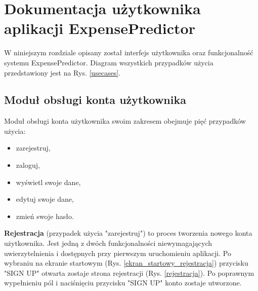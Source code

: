 \chapter{Dokumentacja użytkownika aplikacji ExpensePredictor}
W niniejszym rozdziale opisany został interfejs użytkownika oraz funkcjonalność systemu ExpensePredictor. Diagram wszystkich przypadków użycia przedstawiony jest na Rys. \ref{usecases}.
\section{Moduł obsługi konta użytkownika}
Moduł obsługi konta użytkownika swoim zakresem obejmuje pięć przypadków użycia:
\begin{itemize}
	\item zarejestruj,
	\item zaloguj,
	\item wyświetl swoje dane,
	\item edytuj swoje dane,
	\item zmień swoje hasło.
\end{itemize}
\textbf{Rejestracja} (przypadek użycia "zarejestruj") to proces tworzenia nowego konta użytkownika. Jest jedną z dwóch funkcjonalności niewymagających uwierzytelnienia i dostępnych przy pierwszym uruchomieniu aplikacji. Po wybraniu na ekranie startowym (Rys. \ref{ekran_startowy_rejestracja}) przycisku "SIGN UP" otwarta zostaje strona rejestracji (Rys. \ref{rejestracja}). Po poprawnym wypełnieniu pól i naciśnięciu przycisku "SIGN UP" konto zostaje utworzone.
